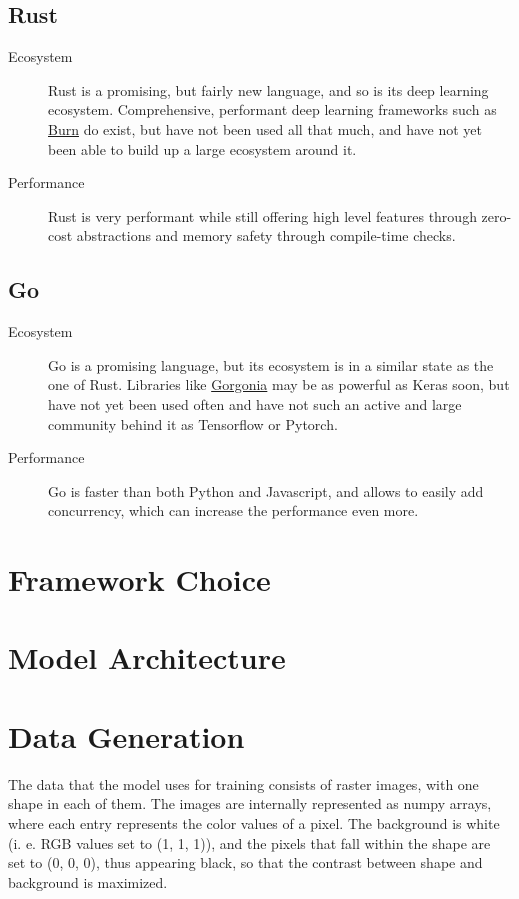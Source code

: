 \documentclass[12pt, a4paper, titlepage]{report}
\begin{document}
{
   \center
   \subsection*{Rust}
}
\begin{description}
   \item[Ecosystem] Rust is a promising, but fairly new language, and so is its deep learning ecosystem. Comprehensive, performant deep learning frameworks such as \href{https://github.com/Tracel-AI/burn}{Burn} do exist, but have not been used all that much, and have not yet been able to build up a large ecosystem around it.
   \item[Performance] Rust is very performant while still offering high level features through zero-cost abstractions and memory safety through compile-time checks.
\end{description}

{
   \center
   \subsection*{Go}
}
\begin{description}
   \item[Ecosystem] Go is a promising language, but its ecosystem is in a similar state as the one of Rust. Libraries like \href{https://github.com/Tracel-AI/gorgonia}{Gorgonia} may be as powerful as Keras soon, but have not yet been used often and have not such an active and large community behind it as Tensorflow or Pytorch.
   \item[Performance] Go is faster than both Python and Javascript, and allows to easily add concurrency, which can increase the performance even more.
\end{description}



\section{Framework Choice}

\section{Model Architecture}


\section{Data Generation}

The data that the model uses for training consists of raster images, with one shape in each of them. The images are internally represented as numpy arrays, where each entry represents the color values of a pixel. The background is white (i. e. RGB values set to (1, 1, 1)), and the pixels that fall within the shape are set to (0, 0, 0), thus appearing black, so that the contrast between shape and background is maximized.
\end{document}
